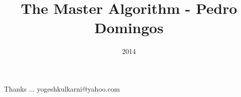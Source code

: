 \documentclass[xcolor=dvipsnames,compress,t,pdf]{beamer}
\title[Master Algorithm \hspace{4cm} \insertframenumber /\inserttotalframenumber]
{The Master Algorithm - Pedro Domingos}
\subtitle[]{}
\date{2014}
\begin{document}
\begin{frame}
\titlepage
\end{frame}




\begin{frame}[c]{}
Thanks ...
\vspace{5mm}
yogeshkulkarni@yahoo.com
\end{frame}
\end{document}
